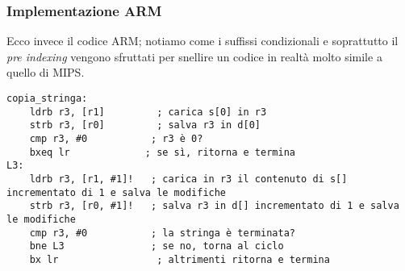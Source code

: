 \documentclass[class=book, crop=false, oneside]{standalone}
\begin{document}
\subsubsection{Implementazione ARM}
Ecco invece il codice ARM; notiamo come i suffissi condizionali  e soprattutto il \emph{pre indexing} vengono sfruttati per snellire un codice in realtà molto simile a quello di MIPS.
\begin{verbatim}
copia_stringa:
	ldrb r3, [r1]	      ; carica s[0] in r3
	strb r3, [r0]	      ; salva r3 in d[0]
	cmp r3, #0	         ; r3 è 0?
	bxeq lr	            ; se sì, ritorna e termina
L3:
	ldrb r3, [r1, #1]!	 ; carica in r3 il contenuto di s[] incrementato di 1 e salva le modifiche
	strb r3, [r0, #1]!	 ; salva r3 in d[] incrementato di 1 e salva le modifiche
	cmp r3, #0	         ; la stringa è terminata?
	bne L3	             ; se no, torna al ciclo
	bx lr	              ; altrimenti ritorna e termina
\end{verbatim}
\end{document}
